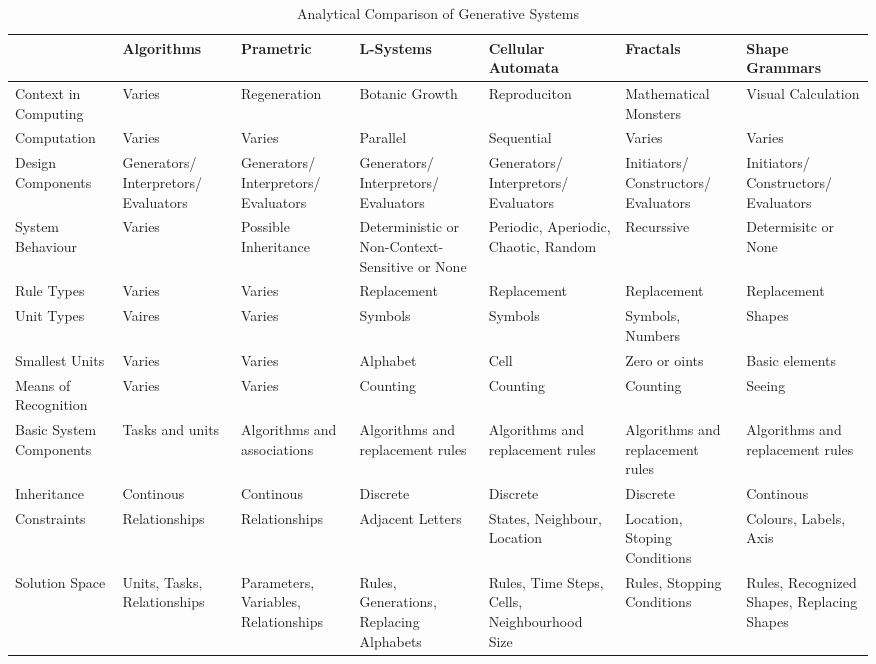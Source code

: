 \begin{table}
\centering
\small
\begin{tabular}{|p{}|p{}p{}p{}p{}p{}p{}|}
\hline 
 &\textbf{Algorithms}&\textbf{Prametric}&\textbf{L-Systems}&\textbf{Cellular Automata}&\textbf{Fractals}&\textbf{Shape Grammars}\\\hline
Context in Computing&Varies&Regeneration&Botanic Growth&Reproduciton&Mathematical Monsters&Visual Calculation\\\hline
Computation&Varies&Varies&Parallel&Sequential&Varies&Varies\\\hline
Design Components&Generators/ Interpretors/ Evaluators&Generators/ Interpretors/ Evaluators&Generators/ Interpretors/ Evaluators&Generators/ Interpretors/ Evaluators&Initiators/ Constructors/ Evaluators&Initiators/ Constructors/ Evaluators\\\hline
System Behaviour&Varies&Possible Inheritance&Deterministic or Non-Context-Sensitive or None&Periodic, Aperiodic, Chaotic, Random&Recurssive&Determisitc or None\\\hline
Rule Types&Varies&Varies&Replacement&Replacement&Replacement&Replacement\\\hline
Unit Types&Vaires&Varies&Symbols&Symbols&Symbols, Numbers&Shapes\\\hline
Smallest Units&Varies&Varies&Alphabet&Cell&Zero or oints&Basic elements\\\hline
Means of Recognition&Varies&Varies&Counting&Counting&Counting&Seeing\\\hline
Basic System Components&Tasks and units&Algorithms and associations&Algorithms and replacement rules&Algorithms and replacement rules&Algorithms and replacement rules&Algorithms and replacement rules\\\hline
Inheritance&Continous&Continous&Discrete&Discrete&Discrete&Continous\\\hline
Constraints&Relationships&Relationships&Adjacent Letters&States, Neighbour, Location&Location, Stoping Conditions&Colours, Labels, Axis\\\hline
Solution Space&Units, Tasks, Relationships&Parameters, Variables, Relationships&Rules, Generations, Replacing Alphabets&Rules, Time Steps, Cells, Neighbourhood Size&Rules, Stopping Conditions&Rules, Recognized Shapes, Replacing Shapes\\\hline
\end{tabular}
\caption[Analytical Comparison of Generative Systems]{Analytical Comparison of Generative Systems \cite{khaldi04}}
\label{tab:GenerativeRecap}
\end{table}

